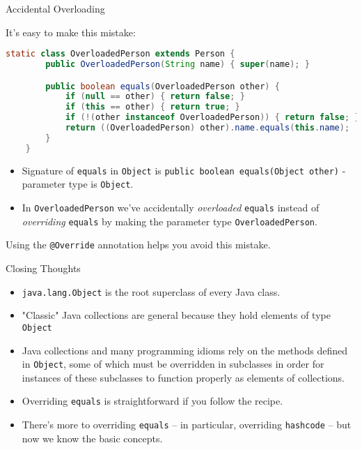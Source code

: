 \documentclass{beamer}
\begin{document}
\begin{frame}[fragile]{Accidental Overloading}

It's easy to make this mistake:
\begin{lstlisting}[language=Java]
    static class OverloadedPerson extends Person {
        public OverloadedPerson(String name) { super(name); }

        public boolean equals(OverloadedPerson other) {
            if (null == other) { return false; }
            if (this == other) { return true; }
            if (!(other instanceof OverloadedPerson)) { return false; }
            return ((OverloadedPerson) other).name.equals(this.name);
        }
    }
\end{lstlisting}

\begin{itemize}
\item Signature of {\tt equals} in {\tt Object} is {\tt public boolean equals(Object other)} - parameter type is {\tt Object}.
\item In {\tt OverloadedPerson} we've accidentally {\it overloaded} {\tt equals} instead of {\it overriding} {\tt equals} by making the parameter type {\tt OverloadedPerson}.
\end{itemize}

Using the {\tt @Override} annotation helps you avoid this mistake.

\end{frame}

\begin{frame}[fragile]{Closing Thoughts}

\begin{itemize}
\item {\tt java.lang.Object} is the root superclass of every Java class.
\item "Classic" Java collections are general because they hold elements of type {\tt Object}
\item Java collections and many programming idioms rely on the methods defined in {\tt Object}, some of which must be overridden in subclasses in order for instances of these subclasses to function properly as elements of collections.
\item Overriding {\tt equals} is straightforward if you follow the recipe.
\item There's more to overriding {\tt equals} -- in particular, overriding {\tt hashcode} -- but now we know the basic concepts.
\end{itemize}

\end{frame}
\end{document}
